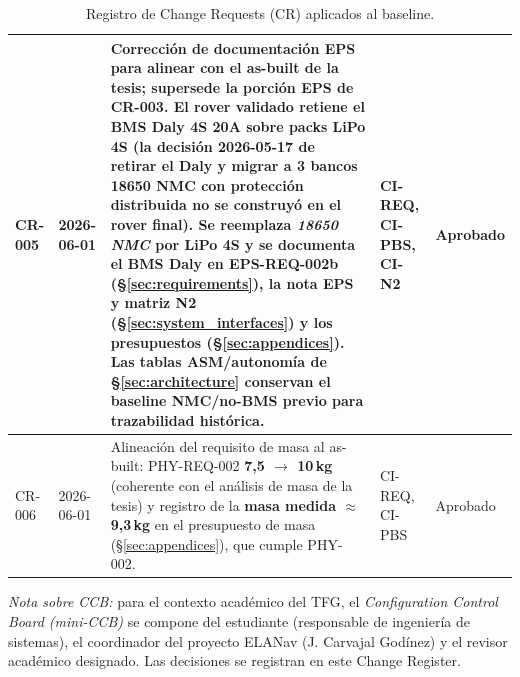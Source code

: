 \begin{table}[H]
\begin{tabularx}{\textwidth}{| l | l | X | l | l |}
CR-005 & 2026-06-01 &
Corrección de documentación EPS para alinear con el as-built de la tesis; \textbf{supersede la porción EPS de CR-003}. El rover validado \textbf{retiene el BMS Daly 4S 20A} sobre packs \textbf{LiPo 4S} (la decisión 2026-05-17 de retirar el Daly y migrar a 3 bancos 18650 NMC con protección distribuida no se construyó en el rover final). Se reemplaza \emph{18650 NMC} por \textbf{LiPo 4S} y se documenta el BMS Daly en EPS-REQ-002b (\S\ref{sec:requirements}), la nota EPS y matriz N2 (\S\ref{sec:system_interfaces}) y los presupuestos (\S\ref{sec:appendices}). Las tablas ASM/autonomía de \S\ref{sec:architecture} conservan el baseline NMC/no-BMS previo para trazabilidad histórica. &
CI-REQ, CI-PBS, CI-N2 &
Aprobado \\ \hline

CR-006 & 2026-06-01 &
Alineación del requisito de masa al as-built: PHY-REQ-002 \textbf{7,5 $\to$ 10\,kg} (coherente con el análisis de masa de la tesis) y registro de la \textbf{masa medida $\approx$9,3\,kg} en el presupuesto de masa (\S\ref{sec:appendices}), que cumple PHY-002. &
CI-REQ, CI-PBS &
Aprobado \\ \hline

\end{tabularx}
\caption{Registro de Change Requests (CR) aplicados al baseline.}
\label{tab:change-register}
\end{table}

\emph{Nota sobre CCB:} para el contexto académico del TFG, el \emph{Configuration Control Board (mini-CCB)} se compone del estudiante (responsable de ingeniería de sistemas), el coordinador del proyecto ELANav (J. Carvajal Godínez) y el revisor académico designado. Las decisiones se registran en este Change Register.
